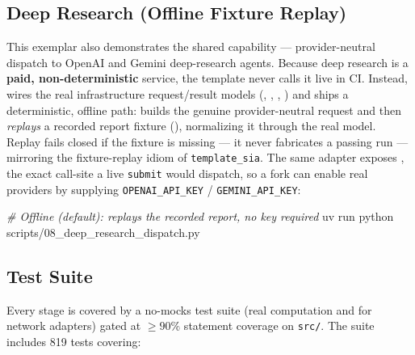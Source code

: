 \documentclass[
  english,
]{article}
\newenvironment{Shaded}{}{}
\newcommand{\CommentTok}[1]{\textcolor[rgb]{0.38,0.63,0.69}{\textit{#1}}}
\newcommand{\ExtensionTok}[1]{#1}
\newcommand{\NormalTok}[1]{#1}
\begin{document}
\subsection{Deep Research (Offline Fixture
Replay)}\label{deep-research-offline-fixture-replay}

This exemplar also demonstrates the shared
 capability ---
provider-neutral dispatch to OpenAI and Gemini deep-research agents.
Because deep research is a \textbf{paid, non-deterministic} service, the
template never calls it live in CI. Instead,
 wires the real
infrastructure request/result models (,
, ,
) and ships a deterministic, offline path:
 builds the genuine
provider-neutral request and then \emph{replays} a recorded report
fixture (),
normalizing it through the real  model.
Replay fails closed if the fixture is missing --- it never fabricates a
passing run --- mirroring the fixture-replay idiom of
\texttt{template\_sia}. The same adapter exposes
, the exact call-site a live
\texttt{submit} would dispatch, so a fork can enable real providers by
supplying \texttt{OPENAI\_API\_KEY} / \texttt{GEMINI\_API\_KEY}:

\begin{Shaded}
\begin{Highlighting}[]
\CommentTok{\# Offline (default): replays the recorded report, no key required}
\ExtensionTok{uv}\NormalTok{ run python scripts/08\_deep\_research\_dispatch.py}
\end{Highlighting}
\end{Shaded}

\subsection{Test Suite}\label{test-suite}

Every stage is covered by a no-mocks test suite (real computation and
 for network adapters) gated at \(\geq 90\%\)
statement coverage on \texttt{src/}. The suite includes 819 tests
covering:
\end{document}

